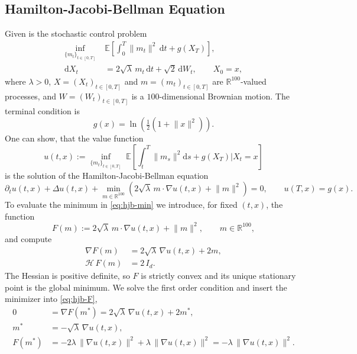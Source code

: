﻿\documentclass[10pt,a4paper]{article}
\begin{document}
\subsection{Hamilton-Jacobi-Bellman Equation}
\label{sec:hjb}
Given is the stochastic control problem
\begin{align*}
\inf_{\{m_t\}_{t\in[0,T]}}\;
& \mathbb E\left[\int_0^T \lVert m_t\rVert^2\,\mathrm dt
+ g(X_T)\right], \\
\mathrm dX_t
&= 2\sqrt{\lambda}\, m_t\,\mathrm dt + \sqrt{2}\,\mathrm dW_t,
\qquad X_0 = x,
\end{align*}
where $\lambda>0$, \(X=(X_t)_{t\in[0,T]}\) and \(m=(m_t)_{t\in[0,T]}\) are \(\mathbb{R}^{100}\)-valued processes, and \(W=(W_t)_{t\in[0,T]}\) is a \(100\)-dimensional Brownian motion. The terminal condition is
\begin{equation*}
g(x) = \ln\!\left(\tfrac12\left(1+\lVert x\rVert^2\right)\right).
\end{equation*}
One can show, that the value function
$$u(t,x) := \inf_{\{m_t\}_{t\in[0,T]}}\; \mathbb E\left[\int_t^T \lVert m_s\rVert^2\mathrm ds + g(X_T)\Big| X_t = x\right]$$
is the solution of the Hamilton-Jacobi-Bellman equation
\begin{equation}
\partial_t u(t,x) + \Delta u(t,x)
+ \min_{m\in\mathbb R^{100}}
\left(2\sqrt{\lambda}\, m\cdot\nabla u(t,x) + \lVert m\rVert^2\right) = 0,
\qquad
u(T,x) = g(x).
\label{eq:hjb-min}
\end{equation}
To evaluate the minimum in \eqref{eq:hjb-min} we introduce, for fixed $(t,x)$, the function
\begin{equation}
F(m) := 2\sqrt{\lambda}\, m\cdot\nabla u(t,x) + \lVert m\rVert^2,
\qquad m\in\mathbb R^{100},
\label{eq:hjb-F}
\end{equation}
and compute
\begin{align*}
\nabla F(m) &= 2\sqrt{\lambda}\,\nabla u(t,x) + 2m,
\\
\mathcal{H}\, F(m) &= 2\,I_d.
\end{align*}
The Hessian is positive definite, so $F$ is strictly convex and its unique stationary point is the global minimum. We solve the first order condition and insert the minimizer into \eqref{eq:hjb-F},
\begin{align}
0 &= \nabla F(m^{\ast})
= 2\sqrt{\lambda}\,\nabla u(t,x) + 2m^{\ast},
\nonumber\\
m^{\ast} &= -\sqrt{\lambda}\,\nabla u(t,x),
\nonumber\\
F(m^{\ast})
&= -2\lambda\,\lVert\nabla u(t,x)\rVert^2
+ \lambda\,\lVert\nabla u(t,x)\rVert^2
= -\lambda\,\lVert\nabla u(t,x)\rVert^2 .
\label{eq:hjb-minimizer}
\end{align}
\end{document}
